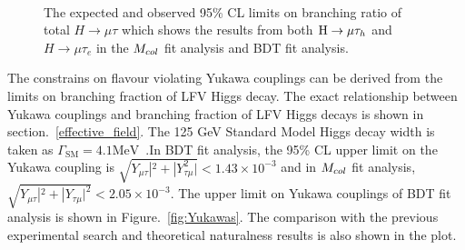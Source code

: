 \begin{figure}[htbp] 
     \centering
     \\
     \caption{The expected and observed 95\% CL limits on branching ratio of total $H \to \mu\tau$ which shows the results from both $\mathrm{H}\to \mu\tau_{h}$ and $H \to \mu\tau_{e}$ in the $M_{col}$ fit analysis and BDT fit analysis.}
     \label{fig:cutbasedpostfit}
\end{figure}



The constrains on flavour violating Yukawa couplings can be derived from the limits on branching fraction of  LFV Higgs decay. The exact relationship between Yukawa couplings and branching fraction of LFV Higgs decays is shown in section.~\ref{effective_field}. The 125 GeV Standard Model Higgs  decay width is taken as $\Gamma_{\mathrm{SM}}=4.1\textrm{MeV}$~\cite{Denner:2011mq}.In BDT fit analysis, the 95\% CL upper limit on the Yukawa coupling is $\sqrt{Y_{\mu\tau}|^2 + |Y_{\tau\mu}^2|}<1.43\times 10^{-3}$ and in $M_{col}$ fit analysis, $\sqrt{Y_{\mu\tau}|^2 + |Y_{\tau\mu}|^2}<2.05\times 10^{-3}$. The upper limit on Yukawa couplings of BDT fit analysis is shown in Figure.~\ref{fig:Yukawas}. The comparison with the previous experimental search and theoretical naturalness results is also shown in the plot. 





